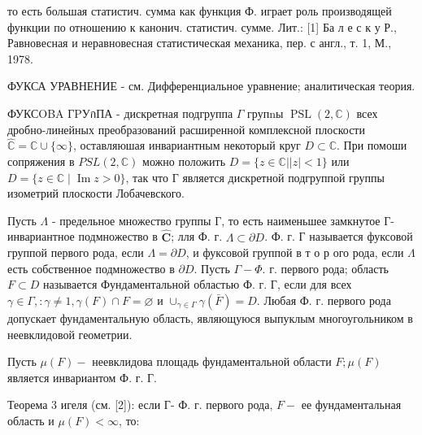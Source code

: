 \documentclass[10pt]{article}
\begin{document}
то есть большая статистич. сумма как функция Ф. играет роль производящей функции по отношению к канонич. статистич. сумме. Лит.: [1] Ба л е с к у Р., Равновесная и неравновесная статистическая механика, пер. с англ., т. 1, М., 1978.



ФУКСА УРАВНЕНИЕ - см. Дифференциальное уравнение; аналитическая теория.



ФУКСOBA ГPУกПА - дискретная подгруппа $\Gamma$ групnы $\operatorname{PSL}(2, \mathbb{C})$ всех дробно-линейных преобразований расширенной комплексной плоскости $\hat{\mathbb{C}}=\mathbb{C} \cup\{\infty\}$, оставляюшая инвариантным некоторый круг $D \subset \mathbb{C}$. При помоши сопряжения в $P S L(2, \mathbb{C})$ можно положить $D=\{z \in \mathbb{C}|| z \mid<1\}$ или $D=\{z \in \mathbb{C} \mid \operatorname{Im} z>0\}$, так что Г является дискретной подгруппой группы изометрий плоскости Лобачевского.



Пусть $\Lambda$ - предельное множество группы $Г$, то есть наименьшее замкнутое Г-инвариантное подмножество в $\hat{\mathbf{C}}$; лля Ф. г. $\Lambda \subset \partial D$. Ф. г. Г называется фуксовой группой первого рода, если $\Lambda=\partial D$, и фуксовой группой в т о р ого рода, если $\Lambda$ есть собственное подмножество в $\partial D$. Пусть $\Gamma-\Phi$. г. первого рода; область $F \subset D$ называется Фундаментальной областью Ф. г. Г, если для всех $\gamma \in \Gamma,: \gamma \neq 1, \gamma(F) \cap F=\varnothing$ и $\cup_{\gamma \in \Gamma} \gamma(\bar{F})=D$. Любая Ф. г. первого рода допускает фундаментальную область, являющуюся выпуклым многоугольником в неевклидовой геометрии.



Пусть $\mu(F)-$ неевклидова площадь фундаментальной области $F ; \mu(F)$ является инвариантом Ф. г. Г.



Теорема 3 игеля (см. [2]): если Г- Ф. г. первого рода, $F-$ ее фундаментальная область и $\mu(F)<\infty$, то:
\end{document}
